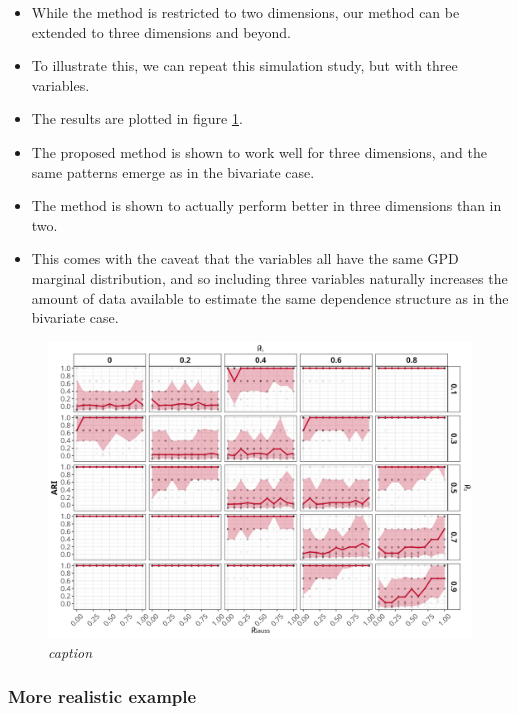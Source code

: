 \documentclass{article}
\numberwithin{equation}{section}
\begin{document}
\begin{itemize}
  \item While the \cite{Vignotto2021} method is restricted to two dimensions, our method can be extended to three dimensions and beyond.
  \item To illustrate this, we can repeat this simulation study, but with three variables. 
  \item The results are plotted in figure \ref{fig:02_3d}.
  \item The proposed method is shown to work well for three dimensions, and the same patterns emerge as in the bivariate case.
  \item The method is shown to actually perform better in three dimensions than in two.
  \item This comes with the caveat that the variables all have the same GPD marginal distribution, and so including three variables naturally increases the amount of data available to estimate the same dependence structure as in the bivariate case. 
\end{itemize}

\begin{figure}[H]
    \centering
    \includegraphics[width = 0.9\linewidth]{plots/sim_01c_js_sens_3_var_dqu_0.9.png}
    \caption{\emph{caption}}
    \label{fig:02_3d}
\end{figure}

\subsubsection{More realistic example} \label{subsubsec:sim_realistic}

\end{document}
